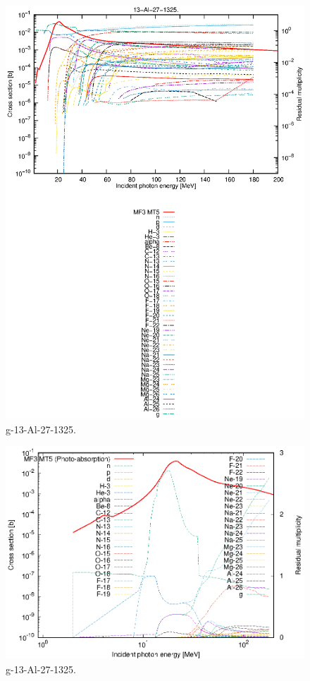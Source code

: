 \begin{figure}
 \includegraphics[width=\linewidth]{eps/g_13-Al-27_1325.eps}
  \caption{g-13-Al-27-1325.}
\end{figure}
\newpage \clearpage

\begin{figure}
 \includegraphics[width=\linewidth]{eps-log/g_13-Al-27_1325.eps}
 \caption{g-13-Al-27-1325.}
\end{figure}
\newpage \clearpage

